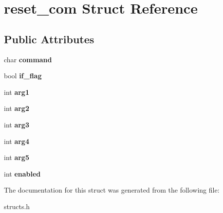 \hypertarget{structreset__com}{\section{reset\-\_\-com Struct Reference}
\label{structreset__com}
}
\subsection*{Public Attributes}
\begin{DoxyCompactItemize}
\item 
\hypertarget{structreset__com_a6cca09d17ef8ba4765b1bddfe1cb6e31}{char {\bfseries command}}\label{structreset__com_a6cca09d17ef8ba4765b1bddfe1cb6e31}

\item 
\hypertarget{structreset__com_a255ba6742e464970df5f61fc9b8ccdf2}{bool {\bfseries if\-\_\-flag}}\label{structreset__com_a255ba6742e464970df5f61fc9b8ccdf2}

\item 
\hypertarget{structreset__com_a635a6d7d405f9fda34d53803b48cc652}{int {\bfseries arg1}}\label{structreset__com_a635a6d7d405f9fda34d53803b48cc652}

\item 
\hypertarget{structreset__com_a413552875fa3046ab670a408918494e1}{int {\bfseries arg2}}\label{structreset__com_a413552875fa3046ab670a408918494e1}

\item 
\hypertarget{structreset__com_abe997d85fe29ad69fced2bd95be362f7}{int {\bfseries arg3}}\label{structreset__com_abe997d85fe29ad69fced2bd95be362f7}

\item 
\hypertarget{structreset__com_ae37b00076aad4228e62e64d9381faa2b}{int {\bfseries arg4}}\label{structreset__com_ae37b00076aad4228e62e64d9381faa2b}

\item 
\hypertarget{structreset__com_aabf92f34a2d4a1bc0bb0a8fd06815fb6}{int {\bfseries arg5}}\label{structreset__com_aabf92f34a2d4a1bc0bb0a8fd06815fb6}

\item 
\hypertarget{structreset__com_a369ae25ef1e17e4ae30d54d94c095cfd}{int {\bfseries enabled}}\label{structreset__com_a369ae25ef1e17e4ae30d54d94c095cfd}

\end{DoxyCompactItemize}


The documentation for this struct was generated from the following file\-:\begin{DoxyCompactItemize}
\item 
structs.\-h\end{DoxyCompactItemize}
